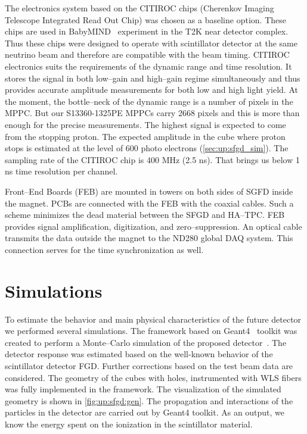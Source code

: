 \documentclass[main.tex]{subfiles}
\begin{document}
The electronics system based on the CITIROC chips (Cherenkov Imaging Telescope Integrated Read Out Chip) was chosen as a baseline option. These chips are used in BabyMIND~\cite{Blondel2015b} experiment in the T2K near detector complex. Thus these chips were designed to operate with scintillator detector at the same neutrino beam and therefore are compatible with the beam timing. CITIROC electronics suits the requirements of the dynamic range and time resolution. It stores the signal in both low--gain and high--gain regime simultaneously and thus provides accurate amplitude measurements for both low and high light yield. At the moment, the bottle--neck of the dynamic range is a number of pixels in the MPPC. But our S13360-1325PE MPPCs carry 2668 pixels and this is more than enough for the precise measurements. The highest signal is expected to come from the stopping proton. The expected amplitude in the cube where proton stops is estimated at the level of 600 photo electrons (\autoref{sec:up:sfgd_sim}). The sampling rate of the CITIROC chip is 400 MHz (2.5 ns). That brings us below 1 ns time resolution per channel.

Front--End Boards (FEB) are mounted in towers on both sides of SGFD inside the magnet. PCBs are connected with the FEB with the coaxial cables. Such a scheme minimizes the dead material between the SFGD and HA--TPC. FEB provides signal amplification, digitization, and zero--suppression. An optical cable transmits the data outside the magnet to the ND280 global DAQ system. This connection serves for the time synchronization as well.

\section{Simulations}
\label{sec:up:sfgd_sim}
To estimate the behavior and main physical characteristics of the future detector we performed several simulations. The framework based on Geant4~\cite{Agostinelli2003} toolkit was created to perform a Monte--Carlo simulation of the proposed detector~\cite{ndUpRepo}. The detector response was estimated based on the well-known behavior of the scintillator detector FGD. Further corrections based on the test beam data are considered. The geometry of the cubes with holes, instrumented with WLS fibers was fully implemented in the framework. The visualization of the simulated geometry is shown in \autoref{fig:up:sfgd:gen}. The propagation and interactions of the particles in the detector are carried out by Geant4 toolkit. As an output, we know the energy spent on the ionization in the scintillator material.
\end{document}
